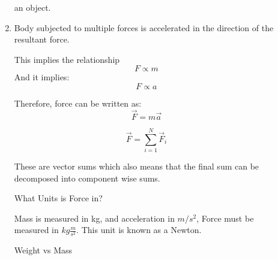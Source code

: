 \documentclass{report}
\begin{document}
\begin{description}
\begin{enumerate}
\begin{mdframed}
\begin{mdframed}
                        an object.
                    \end{mdframed}
                \end{mdframed}
            \item Body subjected to multiple forces is accelerated
                in the direction of the resultant force.
                \begin{mdframed}
                    This implies the relationship
                    \begin{displaymath}
                        F \propto m
                    \end{displaymath}
                    And it implies:
                    \begin{displaymath}
                        F \propto a
                    \end{displaymath}

                    Therefore, force can be written as:
                    \begin{displaymath}
                        \vec{F} = m\vec{a}
                    \end{displaymath}

                    \begin{center}
                    \end{center}

                    \begin{displaymath}
                        \vec{F} = \sum_{i = 1}^N \vec{F}_i 
                    \end{displaymath}

                    These are vector sums which also means that
                    the final sum can be decomposed into component
                    wise sums.
                \end{mdframed}
                \pagebreak
                \begin{mdframed}
                   What Units is Force in?

                   \vspace{10pt}

                   Mass is measured in kg, and acceleration in
                   $m/s^2$, Force must be measured in $kg  \frac{m}{s^2}$.
                   This unit is known as a Newton.
                \end{mdframed}
                \begin{mdframed}
                    Weight vs Mass


\end{mdframed}
\end{enumerate}
\end{description}
\end{document}
